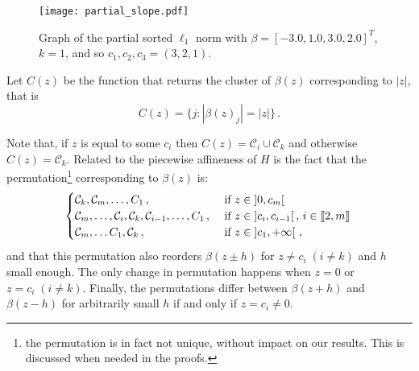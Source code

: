 \begin{figure}[htbp]
  \centering
  \texttt{[image: partial\_slope.pdf]}
  \caption{Graph of the partial sorted $\ell_1$ norm with \(\beta = [-3.0, 1.0, 3.0, 2.0]^T\), \(k = 1\), and so $c_1, c_2, c_3 = (3, 2, 1)$.}
  \label{fig:partial_slope}
\end{figure}

Let \(C(z)\) be the function that returns the cluster of $\beta(z)$ corresponding to \(|z|\), that is
\begin{equation}
  C(z) = \{j : |\beta(z)_j| = |z|\} \,.
\end{equation}

\begin{remark}\label{rem:permutation_C_z}
  Note that, if $z$ is equal to some $c_i$ then $C(z) = \mathcal{C}_i \cup \mathcal{C}_k$ and otherwise $C(z) = \mathcal{C}_k$.
  Related to the piecewise affineness of $H$ is the fact that the permutation\footnote{the permutation is in fact not unique, without impact on our results. This is discussed when needed in the proofs.} corresponding to $\beta(z)$ is:
  \begin{equation*}
    \begin{cases}
    \mathcal{C}_k, \mathcal{C}_m, \ldots, C_1 \, ,
        &\text{ if } z \in \left]0, c_m\right[ \, \\
    \mathcal{C}_m, \ldots ,\mathcal{C}_i, \mathcal{C}_k, \mathcal{C}_{i-1}, \ldots, C_1 \, ,
        &\text{ if } z \in \left]c_{i}, c_{i-1} \right[, \, i \in \llbracket 2 , m \rrbracket \, \\
    \mathcal{C}_m, \ldots C_1,  \mathcal{C}_k \, ,
        &\text{ if } z \in \left]c_1, +\infty \right[ \, , \\
    \end{cases}
  \end{equation*}
  and that this permutation also reorders $\beta(z \pm h)$ for $z \neq c_i \; (i \neq k)$ and $h$ small enough.
  The only change in permutation happens when $z = 0$ or $z = c_i \; (i \neq k)$.
  Finally, the permutations differ between $\beta(z + h)$ and $\beta(z - h)$ for arbitrarily small $h$ if and only if $z = c_i \neq 0$.
\end{remark}

